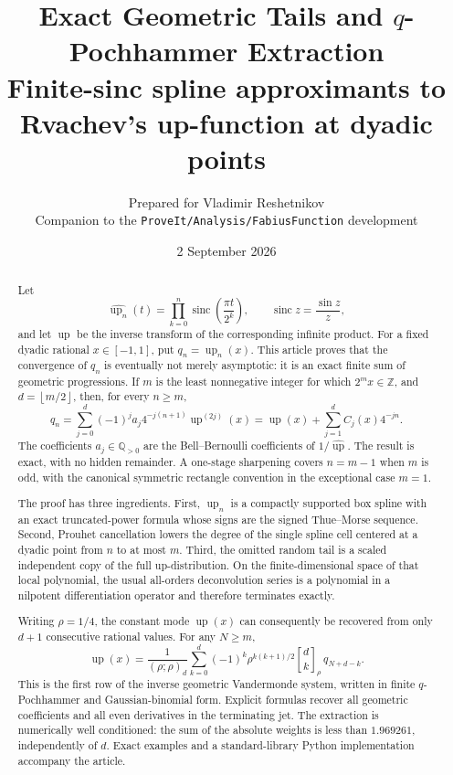 \documentclass[11pt,oneside]{article}
\title{\bfseries Exact Geometric Tails and \texorpdfstring{$q$}{q}-Pochhammer Extraction\\[0.3em]
\large Finite-sinc spline approximants to Rvachev's up-function at dyadic points}
\author{Prepared for Vladimir Reshetnikov\\
\small Companion to the \texttt{ProveIt/Analysis/FabiusFunction} development}
\date{2 September 2026}
\theoremstyle{definition}
\theoremstyle{remark}
\newcommand{\Z}{\mathbb Z}
\newcommand{\Q}{\mathbb Q}
\newcommand{\up}{\operatorname{up}}
\newcommand{\sinc}{\operatorname{sinc}}
\newcommand{\qbinom}[3]{\genfrac{[}{]}{0pt}{}{#1}{#2}_{#3}}
\newcommand{\floor}[1]{\left\lfloor#1\right\rfloor}
\begin{document}
\maketitle

\begin{abstract}
Let
\[
 \widehat{\up_n}(t)=\prod_{k=0}^{n}\sinc\!\left(\frac{\pi t}{2^k}\right),
 \qquad \sinc z=\frac{\sin z}{z},
\]
and let \(\up\) be the inverse transform of the corresponding infinite product.
For a fixed dyadic rational \(x\in[-1,1]\), put \(q_n=\up_n(x)\).
This article proves that the convergence of \(q_n\) is eventually not merely
asymptotic: it is an exact finite sum of geometric progressions.
If \(m\) is the least nonnegative integer for which \(2^m x\in\Z\), and
\(d=\floor{m/2}\), then, for every \(n\ge m\),
\[
 q_n=\sum_{j=0}^{d}(-1)^j a_j4^{-j(n+1)}\up^{(2j)}(x)
     =\up(x)+\sum_{j=1}^{d}C_j(x)4^{-jn}.
\]
The coefficients \(a_j\in\Q_{>0}\) are the Bell--Bernoulli coefficients of
\(1/\widehat{\up}\).  The result is exact, with no hidden remainder.  A
one-stage sharpening covers \(n=m-1\) when \(m\) is odd, with the canonical
symmetric rectangle convention in the exceptional case \(m=1\).

The proof has three ingredients.  First, \(\up_n\) is a compactly supported
box spline with an exact truncated-power formula whose signs are the signed
Thue--Morse sequence.  Second, Prouhet cancellation lowers the degree of the
single spline cell centered at a dyadic point from \(n\) to at most \(m\).
Third, the omitted random tail is a scaled independent copy of the full
up-distribution.  On the finite-dimensional space of that local polynomial,
the usual all-orders deconvolution series is a polynomial in a nilpotent
differentiation operator and therefore terminates exactly.

Writing \(\rho=1/4\), the constant mode \(\up(x)\) can consequently be
recovered from only \(d+1\) consecutive rational values.  For any \(N\ge m\),
\[
 \boxed{\displaystyle
 \up(x)=\frac{1}{(\rho;\rho)_d}
 \sum_{k=0}^{d}(-1)^k\rho^{k(k+1)/2}
 \qbinom{d}{k}{\rho}\,q_{N+d-k}.}
\]
This is the first row of the inverse geometric Vandermonde system, written in
finite \(q\)-Pochhammer and Gaussian-binomial form.  Explicit formulas recover
all geometric coefficients and all even derivatives in the terminating jet.
The extraction is numerically well conditioned: the sum of the absolute
weights is less than \(1.969261\), independently of \(d\).  Exact examples and
a standard-library Python implementation accompany the article.
\end{abstract}
\end{document}
